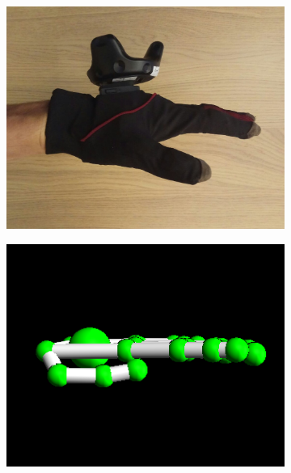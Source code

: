\documentclass[hyperref, bachelorofscience]{cgvpub}
\begin{document}
\begin{figure}[b!]
	\begin{subfigure}{.235\linewidth}
		\includegraphics[width=\linewidth]{../pics/hand_radial_flat}
	\end{subfigure}
	\vspace{.1cm}
	\hspace{.01cm}
	\begin{subfigure}{.235\linewidth}
		\includegraphics[width=\linewidth]{../pics/model_radial_flat}
	\end{subfigure}
	\hfill
	\begin{subfigure}{.235\linewidth}

\end{subfigure}
\end{figure}
\end{document}
